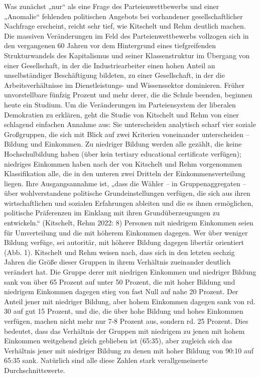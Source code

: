 \begin{multicols*}{2}
    Was zunächst „nur“ als eine Frage des Parteienwettbewerbs und einer „Anomalie“ fehlenden politischen Angebots bei vorhandener gesellschaftlicher Nachfrage erscheint, reicht sehr tief, wie Kitschelt und Rehm deutlich machen. Die massiven Veränderungen im Feld des Parteienwettbewerbs vollzogen sich in den vergangenen 60 Jahren vor dem Hintergrund eines tiefgreifenden Strukturwandels des Kapitalismus und seiner Klassenstruktur im Übergang von einer Gesellschaft, in der die Industriearbeiter einen hohen Anteil an unselbständiger Beschäftigung bildeten, zu einer Gesellschaft, in der die Arbeitsverhältnisse im Dienstleistungs- und Wissenssektor dominieren. Früher unvorstellbare fünfzig Prozent und mehr derer, die die Schule beenden, beginnen heute ein Studium. Um die Veränderungen im Parteiensystem der liberalen Demokratien zu erklären, geht die Studie von Kitschelt und Rehm von einer schlagend einfachen Annahme aus: Sie unterscheiden analytisch scharf vier soziale Großgruppen, die sich mit Blick auf zwei Kriterien voneinander unterscheiden – Bildung und Einkommen. Zu niedriger Bildung werden alle gezählt, die keine Hochschulbildung haben (über kein tertiary educational certificate verfügen); niedriges Einkommen haben nach der von Kitschelt und Rehm vorgenommen Klassifikation alle, die in den unteren zwei Dritteln der Einkommensverteilung liegen. Ihre Ausgangsannahme ist, „dass die Wähler – in Gruppenaggregaten – über wohlverstandene politische Grundeinstellungen verfügen, die sich aus ihren wirtschaftlichen und sozialen Erfahrungen ableiten und die es ihnen ermöglichen, politische Präferenzen im Einklang mit ihren Grundüberzeugungen zu entwickeln.“ (Kitschelt, Rehm 2022: 8) Personen mit niedrigem Einkommen seien für Umverteilung und die mit höherem Einkommen dagegen. Wer über weniger Bildung verfüge, sei autoritär, mit höherer Bildung dagegen libertär orientiert (Abb. 1). Kitschelt und Rehm weisen nach, dass sich in den letzten sechzig Jahren die Größe dieser Gruppen in ihrem Verhältnis zueinander deutlich verändert hat. Die Gruppe derer mit niedrigen Einkommen und niedriger Bildung sank von über 65 Prozent auf unter 50 Prozent, die mit hoher Bildung und niedrigem Einkommen dagegen stieg von fast Null auf nahe 20 Prozent. Der Anteil jener mit niedriger Bildung, aber hohem Einkommen dagegen sank von rd. 30 auf gut 15 Prozent, und die, die über hohe Bildung und hohes Einkommen verfügen, machen nicht mehr nur 7-8 Prozent aus, sondern rd. 25 Prozent. Dies bedeutet, dass das Verhältnis der Gruppen mit niedrigem zu jenen mit hohem Einkommen weitgehend gleich geblieben ist (65:35), aber zugleich sich das Verhältnis jener mit niedriger Bildung zu denen mit hoher Bildung von 90:10 auf 65:35 sank. Natürlich sind alle diese Zahlen stark verallgemeinerte Durchschnittswerte. 


\end{multicols*}
